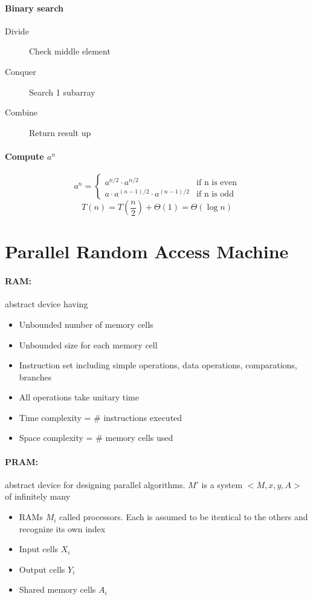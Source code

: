 \documentclass{article}
\begin{document}
\paragraph{Binary search}
\begin{description}
\item[Divide] Check middle element
\item[Conquer] Search 1 subarray
\item[Combine] Return result up
\end{description}

\paragraph{Compute $a^n$}
\[a^n=\begin{cases}
	a^{n/2} \cdot a^{n/2}					&	\text{if n is even}\\
	a \cdot a^{(n-1)/2} \cdot a^{(n-1)/2}	&	\text{if n is odd}
\end{cases}
\]
\[T(n)=T\left(\frac{n}{2}\right)+\Theta(1)=\Theta(\log n)\]



\section{Parallel Random Access Machine}
\paragraph{RAM:} abstract device having
\begin{itemize}
\item Unbounded number of memory cells
\item Unbounded size for each memory cell
\item Instruction set including simple operations, data operations, comparations, branches
\item All operations take unitary time
\item Time complexity = \# instructions executed
\item Space complexity = \# memory cells used
\end{itemize}
\paragraph{PRAM:} abstract device for designing parallel algorithms. $M'$ is a system $<M,x,y,A>$ of infinitely many
\begin{itemize}
\item RAMs $M_i$ called processors. Each is assumed to be itentical to the others and recognize its own index
\item Input cells $X_i$
\item Output cells $Y_i$
\item Shared memory cells $A_i$
\end{itemize}
\end{document}
